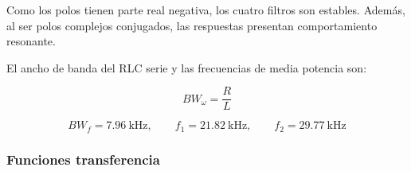 Como los polos tienen parte real negativa, los cuatro filtros son estables. Además, al ser polos complejos conjugados, las respuestas presentan comportamiento resonante.

El ancho de banda del RLC serie y las frecuencias de media potencia son:

\begin{equation}
    \boxed{
    BW_\omega=\frac{R}{L}
    }
\end{equation}

\begin{equation}
    \boxed{
    BW_f=\SI{7.96}{\kilo\hertz},
    \qquad
    f_1=\SI{21.82}{\kilo\hertz},
    \qquad
    f_2=\SI{29.77}{\kilo\hertz}
    }
\end{equation}

\begin{table}[H]
\centering
\caption{$LC,\ RC,\ \omega_0,\ f_0,\ Q,\ \xi$}
\label{tab:parametros_comunes_1}
\end{table}

\begin{table}[H]
\centering
\caption{$p_{1,2},\ BW,\ f_1,\ f_2$}
\label{tab:parametros_comunes_2}
\end{table}

\subsubsection{Funciones transferencia}

\begin{table}[H]
\centering
\caption{$H_2(s),\ H_3(s),\ H_4(s),\ H_5(s)$}
\label{tab:transferencias}
\end{table}

